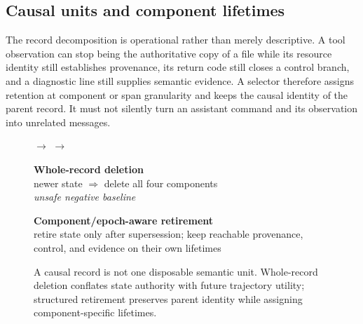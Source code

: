 \documentclass[11pt]{article}
\begin{document}
\subsection{Causal units and component lifetimes}

The record decomposition is operational rather than merely descriptive.  A
tool observation can stop being the authoritative copy of a file while its
resource identity still establishes provenance, its return code still closes a
control branch, and a diagnostic line still supplies semantic evidence.  A
selector therefore assigns retention at component or span granularity and
keeps the causal identity of the parent record.  It must not silently turn an
assistant command and its observation into unrelated messages.

\begin{figure}[H]
\centering
\setlength{\fboxsep}{5pt}
$\longrightarrow$
$\longrightarrow$

\vspace{4pt}
\hfill
{}
\hfill
{}
\hfill
{}

\vspace{4pt}
\begin{minipage}{.46\linewidth}
\centering
\textbf{Whole-record deletion}\\
newer state $\Rightarrow$ delete all four components\\
\emph{unsafe negative baseline}
\end{minipage}
\hfill
\begin{minipage}{.49\linewidth}
\centering
\textbf{Component/epoch-aware retirement}\\
retire state only after supersession; keep reachable provenance,
control, and evidence on their own lifetimes
\end{minipage}
\caption{A causal record is not one disposable semantic unit.  Whole-record
deletion conflates state authority with future trajectory utility; structured
retirement preserves parent identity while assigning component-specific
lifetimes.}
\label{fig:record-decomposition}
\end{figure}
\end{document}

